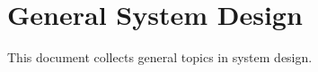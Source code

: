 \documentclass{article}
\begin{document}
\section*{General System Design}
This document collects general topics in system design.
\end{document}
